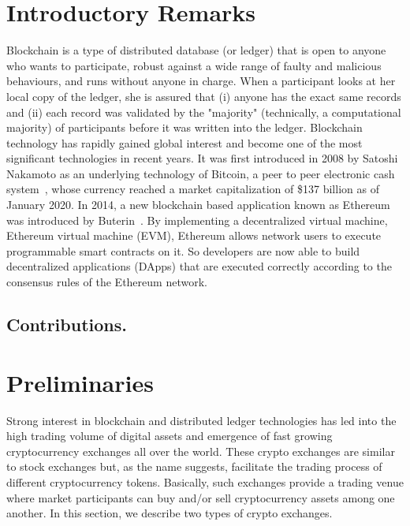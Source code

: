 


\section{Introductory Remarks}

Blockchain is a type of distributed database (or ledger) that is open to anyone who wants to participate, robust against a wide range of faulty and malicious behaviours, and runs without anyone in charge. When a participant looks at her local copy of the ledger, she is assured that (i) anyone has the exact same records and (ii) each record was validated by the "majority" (technically, a computational majority) of participants before it was written into the ledger. Blockchain technology has rapidly gained global interest and become one of the most significant technologies in recent years. It was first introduced in 2008 by Satoshi Nakamoto as an underlying technology of Bitcoin, a peer to peer electronic cash system~\cite{nakamoto2019bitcoin}, whose currency reached a market capitalization of \$137 billion as of January 2020. In 2014, a new blockchain based application known as Ethereum was introduced by Buterin~\cite{buterin2014next}. By implementing a decentralized virtual machine, Ethereum virtual machine (EVM), Ethereum allows network users to execute programmable smart contracts on it. So developers are now able to build decentralized applications (DApps) that are executed correctly according to the consensus rules of the Ethereum network. 

\subsection*{Contributions.}





\section{Preliminaries}

Strong interest in blockchain and distributed ledger technologies has led into the high trading volume of digital assets and emergence of fast growing cryptocurrency exchanges all over the world. These crypto exchanges are similar to stock exchanges but, as the name suggests, facilitate the trading process of different cryptocurrency tokens. Basically, such exchanges provide a trading venue where market participants can buy and/or sell cryptocurrency assets among one another. In this section, we describe two types of crypto exchanges.


